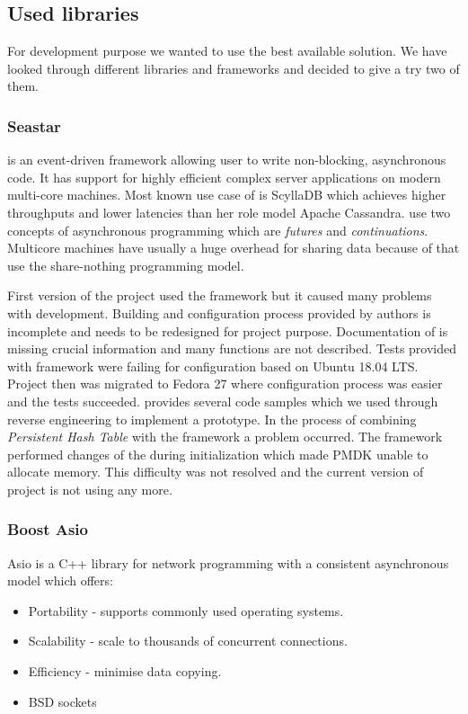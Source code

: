     \subsection{Used libraries}
        For development purpose we wanted to use the best available solution.
        We have looked through different libraries and frameworks and decided to give a try two of them.
        \subsubsection{Seastar}
            \Seastar\cite{Seastar} is an event-driven framework allowing user to write non-blocking, asynchronous code.
            It has support for highly efficient complex server applications on modern multi-core machines.
            Most known use case of \Seastar is ScyllaDB\cite{ScyllaDB} which achieves higher throughputs and lower latencies than her role model Apache Cassandra\cite{Cassandra}.
            \Seastar use two concepts of asynchronous programming which are \textit{futures} and \textit{continuations}.
            Multicore machines have usually a huge overhead for sharing data because of that \Seastar use the share-nothing programming model.
            
            First version of the project used the \Seastar framework but it caused many problems with development.
            Building and configuration process provided by authors is incomplete and needs to be redesigned for project purpose.
            Documentation of \Seastar is missing crucial information and many functions are not described.
            Tests provided with framework were failing for configuration based on Ubuntu 18.04 LTS.
            Project then was migrated to Fedora 27 where configuration process was easier and the tests succeeded.
            \Seastar provides several code samples which we used through reverse engineering to implement a prototype.
            In the process of combining \textit{Persistent Hash Table} with the \Seastar framework a problem occurred. 
            The \Seastar framework performed changes of the  \cite{Hugepages} during initialization which made PMDK unable to allocate memory.
            This difficulty was not resolved and the current version of project is not using \Seastar any more.
            
            
        \subsubsection{Boost Asio}
            Asio\cite{Asio} is a C++ library for network programming with a consistent asynchronous model which offers:
            \begin{itemize}
                \item Portability - supports commonly used operating systems.
                \item Scalability - scale to thousands of concurrent connections.
                \item Efficiency - minimise data copying.
                \item BSD sockets
            \end{itemize}